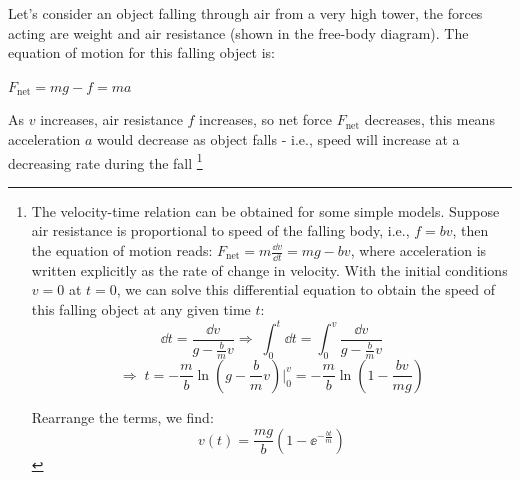 \documentclass[a4paper,12pt]{book}
\newcommand{\fnet}{F_{\text{net}}}
\newcommand{\RA}{\Rightarrow\;}
\begin{document}
Let's consider an object falling through air from a very high tower, the forces acting are weight and air resistance (shown in the free-body diagram). The equation of motion for this falling object is:

{
	\centering
	
	$ \fnet = mg - f = ma $
	
}

As $v$ increases, air resistance $f$ increases, so net force $\fnet$ decreases, this means acceleration $a$ would decrease as object falls - i.e., speed will increase at a decreasing rate during the fall
\footnote[][7cm]{The velocity-time relation can be obtained for some simple models. Suppose air resistance is proportional to speed of the falling body, i.e., $f=bv$, then the equation of motion reads: $\fnet = m \frac{\dd v}{\dd t} = mg - bv$, where acceleration is written explicitly as the rate of change in velocity. With the initial conditions $v=0$ at $t=0$, we can solve this differential equation to obtain the speed of this falling object at any given time $t$:
\begin{equation*}
	\dd t = \frac{\dd v}{g - \frac{b}{m}v} \RA \int_0^t \dd t = \int_0^v \frac{\dd v}{g - \frac{b}{m}v} \end{equation*}
 \begin{equation*}\RA t = -\frac{m}{b} \ln \left(g - \frac{b}{m}v \right) \Bigg|_0^v = -\frac{m}{b} \ln \left( 1 - \frac{bv}{mg}\right)
\end{equation*}
	
Rearrange the terms, we find: 
\begin{equation*}v(t) = \frac{mg}{b} \left(1 - \ee^{-\frac{bt}{m}} \right)\end{equation*}}

\end{document}
